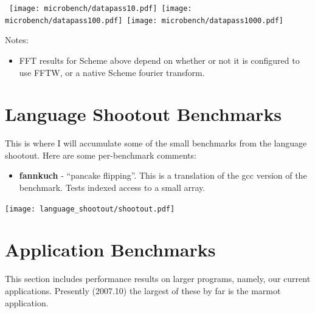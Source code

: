 \documentclass{article}
\begin{document}
\begin{center}
\hbox{
\texttt{[image: microbench/datapass10.pdf]}
\texttt{[image: microbench/datapass100.pdf]}
\texttt{[image: microbench/datapass1000.pdf]}
}
\end{center}

Notes:
\begin{itemize}
\item FFT results for Scheme above depend on whether or not it is
  configured to use FFTW, or a native Scheme fourier transform.
\end{itemize}



\section{Language Shootout Benchmarks}

This is where I will accumulate some of the small benchmarks from the
language shootout.  Here are some per-benchmark comments:

\begin{itemize}
\item {\bf fannkuch} - ``pancake flipping''.  This is a translation of the
  gcc version of the benchmark.  Tests indexed access to a small array.
\end{itemize}

\begin{center}
\texttt{[image: language\_shootout/shootout.pdf]}
\end{center}



\section{Application Benchmarks}

This section includes performance results on larger programs, namely, our
current applications.  Presently (2007.10) the largest of these by far
is the marmot application.
\end{document}
